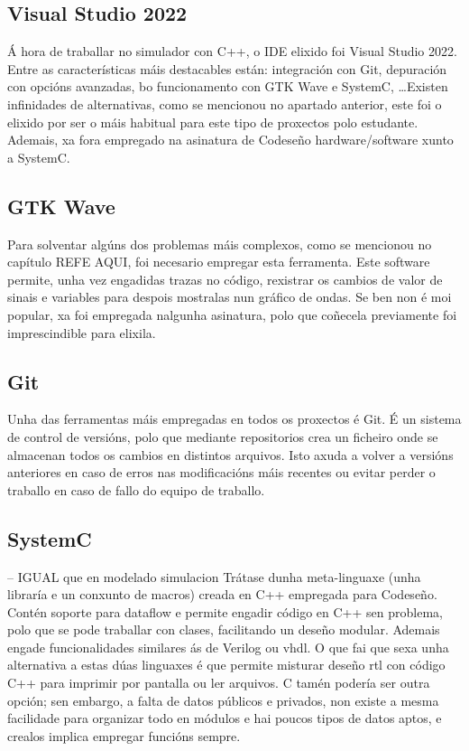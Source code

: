 \subsection{Visual Studio 2022}\label{sec:visual_studio}
Á hora de traballar no simulador con C++, o IDE elixido foi Visual Studio 2022. Entre as características máis destacables están: integración con Git, depuración con opcións avanzadas, bo funcionamento con GTK Wave e SystemC, \dots Existen infinidades de alternativas, como se mencionou no apartado anterior, este foi o elixido por ser o máis habitual para este tipo de proxectos polo estudante. Ademais, xa fora empregado na asinatura de Codeseño \gls{hardware}/\gls{software} xunto a SystemC. 

\subsection{GTK Wave}\label{sec:gtkwave}
Para solventar algúns dos problemas máis complexos, como se mencionou no capítulo REFE AQUI, foi necesario empregar esta ferramenta. Este software permite, unha vez engadidas trazas no código, rexistrar os cambios de valor de sinais e variables para despois mostralas nun gráfico de ondas. Se ben non é moi popular, xa foi empregada nalgunha asinatura, polo que  coñecela previamente foi imprescindible para elixila.

\subsection{Git}\label{sec:git}
Unha das ferramentas máis empregadas en todos os proxectos é Git. É un sistema de control de versións, polo que mediante repositorios crea un ficheiro onde se almacenan todos os cambios en distintos arquivos. Isto axuda a volver a versións anteriores en caso de erros nas modificacións máis recentes ou evitar perder o traballo en caso de fallo do equipo de traballo.


\subsection{SystemC}\label{sec:imp_systemC}
-- IGUAL que en modelado simulacion
Trátase dunha meta-linguaxe (unha libraría e un conxunto de macros) creada en C++ empregada para Codeseño. Contén soporte para dataflow e permite engadir código en C++ sen problema, polo que se pode traballar con clases, facilitando un deseño modular. Ademais engade funcionalidades similares ás de Verilog ou \acrshort{vhdl}. O que fai que sexa unha alternativa a estas dúas linguaxes é que permite misturar deseño \acrshort{rtl} con código C++ para imprimir por pantalla ou ler arquivos. C tamén podería ser outra opción; sen embargo, a falta de datos públicos e privados, non existe a mesma facilidade para organizar todo en módulos e hai poucos tipos de datos aptos, e crealos implica empregar funcións sempre.



